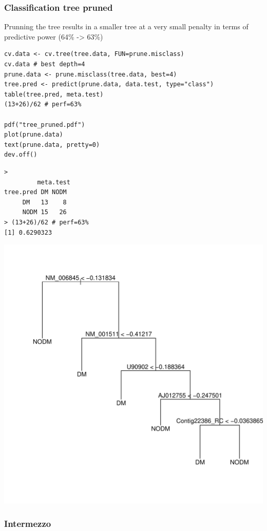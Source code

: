 \documentclass[11pt, a4paper]{article}
\begin{document}
\subsubsection{Classification tree pruned}
\label{sec-1-2-3}

Prunning the tree results in a smaller tree at a very small penalty
in terms of predictive power (64\% -> 63\%)

\begin{verbatim}
cv.data <- cv.tree(tree.data, FUN=prune.misclass)
cv.data # best depth=4
prune.data <- prune.misclass(tree.data, best=4)
tree.pred <- predict(prune.data, data.test, type="class")
table(tree.pred, meta.test)
(13+26)/62 # perf=63%

pdf("tree_pruned.pdf")
plot(prune.data)
text(prune.data, pretty=0)
dev.off()
\end{verbatim}


\begin{verbatim}
> 
         meta.test
tree.pred DM NODM
     DM   13    8
     NODM 15   26
> (13+26)/62 # perf=63%
[1] 0.6290323
\end{verbatim}

\includegraphics[scale=0.7]{tree_pruned.pdf}
\subsubsection{Intermezzo}
\label{sec-1-2-4}
\end{document}
